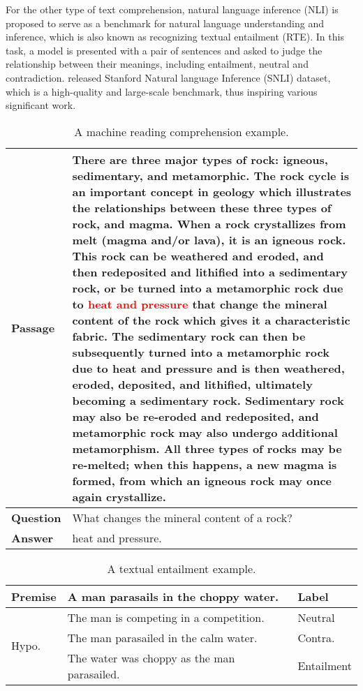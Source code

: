 \documentclass[11pt]{article}
\begin{document}
For the other type of text comprehension, natural language inference (NLI) is proposed to serve as a benchmark for natural language understanding and inference, which is also known as recognizing textual entailment (RTE). In this task, a model is presented with a pair of sentences and asked to judge the relationship between their meanings, including entailment, neutral and contradiction. \citet{Bowman2015A} released Stanford Natural language Inference (SNLI) dataset, which is a high-quality and large-scale benchmark, thus inspiring various significant work. 


\begin{table}
	\centering \scriptsize
	
	{
		\begin{tabular}{l|p{6cm}}
			\hline
			\hline
			{\bf Passage }
			& There are three major types of rock: igneous, sedimentary, and metamorphic. The rock cycle is an important concept in geology which illustrates the relationships between these three types of rock, and magma. When a rock crystallizes from melt (magma and/or lava), it is an igneous rock. This rock can be weathered and eroded, and then redeposited and lithified into a sedimentary rock, or be turned into a metamorphic rock due to \textcolor{red}{heat and pressure} that change the mineral content of the rock which gives it a characteristic fabric. The sedimentary rock can then be subsequently turned into a metamorphic rock due to heat and pressure and is then weathered, eroded, deposited, and lithified, ultimately becoming a sedimentary rock. Sedimentary rock may also be re-eroded and redeposited, and metamorphic rock may also undergo additional metamorphism. All three types of rocks may be re-melted; when this happens, a new magma is formed, from which an igneous rock may once again crystallize. \\ 
			\hline
			{\bf Question} & What changes the mineral content of a rock? \\
			\hline
			{\bf Answer} & heat and pressure. \\
			\hline
			\hline
		\end{tabular}
	}
	\caption{\label{tab:mrc_example} A machine reading comprehension example.}
\end{table}

\begin{table}
	\centering \scriptsize
	
	{
		\begin{tabular}{l|l|l}
			\hline
			\hline
			Premise & A man parasails in the choppy water. & Label\\
			\hline
			\multirow{3}{*}{Hypo.} & The man is competing in a competition. & Neutral \\
			& The man parasailed in the calm water. &  Contra. \\
			&  The water was choppy as the man parasailed. & Entailment \\
			\hline
			\hline
		\end{tabular}
	}
	\caption{\label{tab:rte_example} A textual entailment example.}
\end{table}
\end{document}
